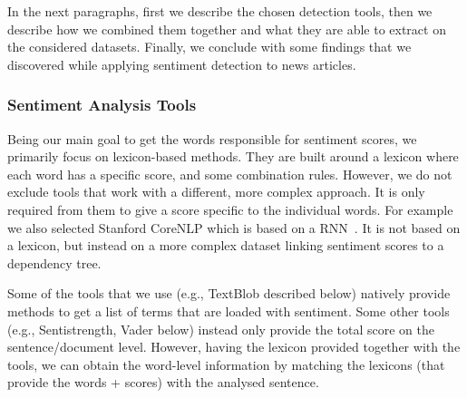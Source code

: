 In the next paragraphs, first we describe the chosen detection tools, then we describe how we combined them together and what they are able to extract on the considered datasets. Finally, we conclude with some findings that we discovered while applying sentiment detection to news articles. %

\subsubsection{\statusgreen Sentiment Analysis Tools}

Being our main goal to get the words responsible for sentiment scores, we primarily focus on lexicon-based methods.
They are built around a lexicon where each word has a specific score, and some combination rules.
However, we do not exclude tools that work with a different, more complex approach. It is only required from them to give a score specific to the individual words. For example we also selected Stanford CoreNLP which is based on a RNN~\citep{socher2013recursive}.
It is not based on a lexicon, but instead on a more complex dataset linking sentiment scores to a dependency tree.

Some of the tools that we use (e.g., TextBlob described below) natively provide methods to get a list of terms that are loaded with sentiment.
Some other tools (e.g., Sentistrength, Vader below) instead only provide the total score on the sentence/document level.
However, having the lexicon provided together with the tools, we can obtain the word-level information by matching the lexicons (that provide the words + scores) with the analysed sentence.

